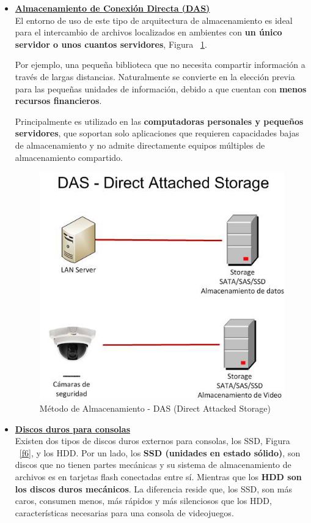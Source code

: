 \documentclass[10pt,journal]{IEEEtran}
\begin{document}
    \begin{itemize}
    \item \underline{\textbf{Almacenamiento de Conexión Directa (DAS)}} \\
    El entorno de uso de este tipo de arquitectura de almacenamiento es ideal para el intercambio de archivos localizados en ambientes con \textbf{un único servidor o unos cuantos servidores}, Figura ~\ref{f5}.
    
    Por ejemplo, una pequeña biblioteca que no necesita compartir información a través de largas distancias.
    Naturalmente se convierte en la elección previa para las pequeñas unidades de información, debido a que cuentan con \textbf{menos recursos financieros}.
    
    Principalmente es utilizado en las \textbf{computadoras personales y pequeños servidores}, que soportan solo aplicaciones que requieren capacidades bajas de almacenamiento y no admite directamente equipos múltiples de almacenamiento compartido.
    
    \begin{figure}[H]
        \begin{center}
            \includegraphics[width=0.3 \textwidth]{Das.png}
            \caption{ Método de Almacenamiento - DAS (Direct Attacked Storage)}
            \label{f5} 
        \end{center}
    \end{figure}
    
    \item \underline{\textbf{Discos duros para consolas}} \\
    Existen dos tipos de discos duros externos para consolas, los SSD, Figura ~\ref{f6}, y los HDD.
    Por un lado, los \textbf{SSD (unidades en estado sólido)}, son discos que no tienen partes mecánicas y su sistema de almacenamiento de archivos es en tarjetas flash conectadas entre sí. Mientras que los \textbf{HDD son los discos duros mecánicos}. La diferencia reside que, los SSD, son más caros, consumen menos, más rápidos y más silenciosos que los HDD, características necesarias para una consola de videojuegos.
    

\end{itemize}
\end{document}
